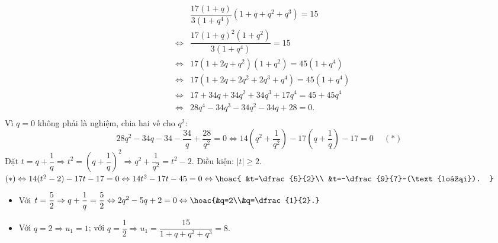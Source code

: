\begin{ex}
{\begin{enumerate}
			\begin{eqnarray*}
				 & &\dfrac{17(1+q)}{3(1+q^4)}(1+q+q^2+q^3)=15\\
				&\Leftrightarrow &\dfrac{17(1+q)^2(1+q^2)}{3(1+q^4)}=15\\ 
				&\Leftrightarrow  &17(1+2q+q^2)(1+q^2) = 45(1+q^4)\\
				&\Leftrightarrow  &17(1+2q+2q^2+2q^3+q^4)=45(1+q^4)\\
				 &\Leftrightarrow &17+34q+34q^2+34q^3+17q^4=45+45q^4\\
				&\Leftrightarrow  &28q^4-34q^3-34q^2-34q+28=0.\\
			\end{eqnarray*}
			Vì $q=0$ không phải là nghiệm, chia hai  vế cho $q^2$:
			\[ 
			28q^2-34q-34-\dfrac{34}{q}+\dfrac{28}{q^2}=0 \Leftrightarrow 14\left(q^2+\dfrac{1}{q^2}\right)-17\left(q+\dfrac{1}{q}\right)-17=0~\quad(\ast) 
			 \]
			Đặt  $t=q+\dfrac{1}{q} \Rightarrow t^2=\left(q+\dfrac{1}{q}\right)^2 \Rightarrow q^2+\dfrac{1}{q^2}=t^2-2$. Điều kiện: $|t|\ge 2$.\\
			$(\ast)  \Leftrightarrow 14(t^2-2)-17t-17=0 \Leftrightarrow 14t^2-17t-45=0 \Leftrightarrow \hoac{
			&t=\dfrac{5}{2}\\ 
			 &t=-\dfrac{9}{7}~(\text{loại}).
			 }$
			\begin{itemize}
				\item Với $t=\dfrac{5}{2}  \Rightarrow q+\dfrac{1}{q}=\dfrac{5}{2} \Leftrightarrow 2q^2-5q+2=0 \Leftrightarrow \hoac{&q=2\\&q=\dfrac{1}{2}.}$
				\item Với $q=2 \Rightarrow u_1=1$; với $q=\dfrac{1}{2} \Rightarrow  u_1=\dfrac{15}{1+q+q^2+q^3}=8.$
			\end{itemize}
		\end{enumerate}
	} 
\end{ex}

